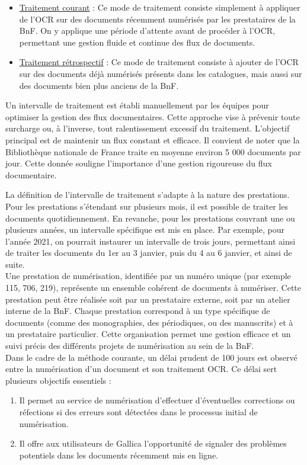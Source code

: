 \documentclass[a4paper,12pt,twoside]{book}
\begin{document}
	\begin{itemize}
		\item \underline{Traitement courant} : Ce mode de traitement consiste simplement à appliquer de l’OCR sur des documents récemment numérisés par les prestataires de la BnF. On y applique une période d’attente avant de procéder à l’OCR, permettant une gestion fluide et continue des flux de documents. \\
		\item \underline{Traitement rétrospectif} : Ce mode de traitement consiste à ajouter de l’OCR sur des documents déjà numérisés présents dans les catalogues, mais aussi sur des documents bien plus anciens de la BnF.  
	\end{itemize}
	
	Un intervalle de traitement est établi manuellement par les équipes pour optimiser la gestion des flux documentaires. Cette approche vise à prévenir toute surcharge ou, à l'inverse, tout ralentissement excessif du traitement. L'objectif principal est de maintenir un flux constant et efficace. Il convient de noter que la Bibliothèque nationale de France traite en moyenne environ 5 000 documents par jour. Cette donnée souligne l'importance d'une gestion rigoureuse du flux documentaire.
	
	La définition de l'intervalle de traitement s'adapte à la nature des prestations. Pour les prestations s'étendant sur plusieurs mois, il est possible de traiter les documents quotidiennement. En revanche, pour les prestations couvrant une ou plusieurs années, un intervalle spécifique est mis en place. Par exemple, pour l'année 2021, on pourrait instaurer un intervalle de trois jours, permettant ainsi de traiter les documents du 1er au 3 janvier, puis du 4 au 6 janvier, et ainsi de suite.
	\\
	
	Une prestation de numérisation, identifiée par un numéro unique (par exemple 115, 706, 219), représente un ensemble cohérent de documents à numériser. Cette prestation peut être réalisée soit par un prestataire externe, soit par un atelier interne de la BnF. Chaque prestation correspond à un type spécifique de documents (comme des monographies, des périodiques, ou des manuscrits) et à un prestataire particulier. Cette organisation permet une gestion efficace et un suivi précis des différents projets de numérisation au sein de la BnF.
	\\
	
	Dans le cadre de la méthode courante, un délai prudent de 100 jours est observé entre la numérisation d'un document et son traitement OCR. Ce délai sert plusieurs objectifs essentiels :
	\begin{enumerate}
		\item Il permet au service de numérisation d'effectuer d'éventuelles corrections ou réfections si des erreurs sont détectées dans le processus initial de numérisation.
		\item Il offre aux utilisateurs de Gallica l'opportunité de signaler des problèmes potentiels dans les documents récemment mis en ligne.
	\end{enumerate}
	
\end{document}
